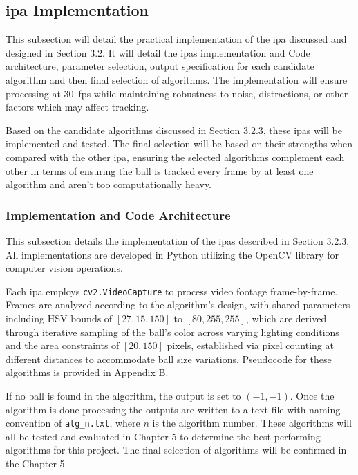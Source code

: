 \documentclass[12pt,a4paper]{article}
\begin{document}
\subsection{\acs{ipa} Implementation}
This subsection will detail the practical implementation of the \acs{ipa} discussed and designed in Section 3.2. It will detail the \acs{ipa}s implementation and Code architecture, parameter selection, output specification for each candidate algorithm and then final selection of algorithms. The implementation will ensure processing at 30~\acs{fps} while maintaining robustness to noise, distractions, or other factors which may affect tracking.

Based on the candidate algorithms discussed in Section 3.2.3, these \acs{ipa}s will be implemented and tested. The final selection will be based on their strengths when compared with the other \acs{ipa}, ensuring the selected algorithms complement each other in terms of ensuring the ball is tracked every frame by at least one algorithm and aren't too computationally heavy.

\subsubsection{Implementation and Code Architecture}
This subsection details the implementation of the \acs{ipa}s described in Section 3.2.3. All implementations are developed in Python utilizing the OpenCV library \parencite{opencv_library} for computer vision operations.

Each \acs{ipa} employs \texttt{cv2.VideoCapture} to process video footage frame-by-frame. Frames are analyzed according to the algorithm's design, with shared parameters including HSV bounds of $[27, 15, 150]$ to $[80, 255, 255]$, which are derived through iterative sampling of the ball's color across varying lighting conditions and the area constraints of $[20, 150]$ pixels, established via pixel counting at different distances to accommodate ball size variations. Pseudocode for these algorithms is provided in Appendix B.

If no ball is found in the algorithm, the output is set to $(-1,-1)$. Once the algorithm is done processing the outputs are written to a text file with naming convention of \texttt{alg\_n.txt}, where $n$ is the algorithm number. These algorithms will all be tested and evaluated in Chapter 5 to determine the best performing algorithms for this project. The final selection of algorithms will be confirmed in the Chapter 5.
\end{document}
